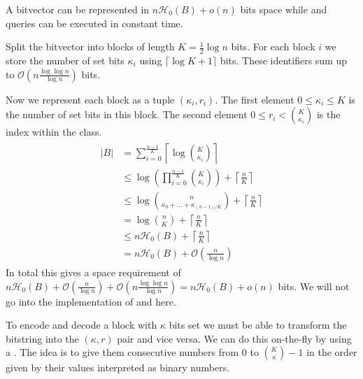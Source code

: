 \begin{Theorem}
  A bitvector can be represented in $n\mathcal{H}_0(B) + o(n)$ bits space while  and  queries can be executed in constant time.
\end{Theorem}

\begin{Proof}
  Split the bitvector into blocks of length $K = \frac{1}{2}\log n$ bits. For each block $i$ we store the number of set bits $\kappa_i$ using $\lceil \log K + 1\rceil$ bits. These identifiers sum up to $\mathcal{O}(n\frac{\log\log n}{\log n})$ bits.

  Now we represent each block as a tuple $(\kappa_i,r_i)$. The first element $0 \leq \kappa_i \leq K$ is the number of set bits in this block. The second element $0 \leq r_i < \binom{K}{\kappa_i}$ is the index within the class.
  \begin{align}
    \begin{aligned}
      \vert B \vert
      &= \sum\limits_{i=0}^\frac{n-1}{K} \left\lceil\log\binom{K}{\kappa_i}\right\rceil \\
      &\leq \log\left(\prod\limits_{i=0}^{\frac{n-1}{K}}\binom{K}{\kappa_i}\right) + \left\lceil\frac{n}{K}\right\rceil \\
      &\leq \log\binom{n}{\kappa_0 + \ldots + \kappa_{(n-1)/K}} + \left\lceil\frac{n}{K}\right\rceil \\
      &= \log\binom{n}{K}  + \left\lceil\frac{n}{K}\right\rceil\\
      &\leq n\mathcal{H}_0(B) + \left\lceil\frac{n}{K}\right\rceil \\
      &= n\mathcal{H}_0(B) + \mathcal{O}\left(\frac{n}{\log n}\right)
    \end{aligned}
  \end{align}
  In total this gives a space requirement of $n\mathcal{H}_0(B) + \mathcal{O}\left(\frac{n}{\log n}\right) + \mathcal{O}(n\frac{\log\log n}{\log n}) = n\mathcal{H}_0(B) + o(n)$ bits. We will not go into the implementation of  and  here.
\end{Proof}

To encode and decode a block with $\kappa$ bits set we must be able to transform the bitstring into the $(\kappa, r)$ pair and vice versa. We can do this on-the-fly by using a . The idea is to give them consecutive numbers from $0$ to $\binom{K}{\kappa}-1$ in the order given by their values interpreted as binary numbers.

